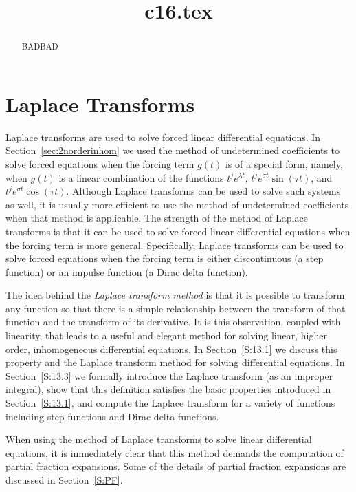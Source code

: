 \documentclass{ximera}
\title{c16.tex}
\begin{document}
\begin{abstract}
BADBAD
\end{abstract}
\maketitle

\chapter{Laplace Transforms}
\label{C:LT}

\normalsize

Laplace transforms are used to solve forced linear differential equations.  
In Section~\ref{sec:2norderinhom} we used the method of undetermined 
coefficients to solve forced equations when the forcing term $g(t)$ is of a 
special form, namely, when $g(t)$ is a linear combination of the functions 
$t^je^{\lambda t}$, $t^je^{\sigma t}\sin(\tau t)$, and 
$t^je^{\sigma t}\cos(\tau t)$.  Although Laplace transforms can be used to 
solve such systems as well, it is usually more efficient to use the method of 
undetermined coefficients when that method is applicable.  The strength of the 
method of Laplace transforms is that it can be used to solve forced linear 
differential equations when the forcing term is more general.  Specifically,
Laplace transforms can be used to solve forced equations when the forcing
term is either discontinuous (a step function) or an impulse function (a Dirac 
delta function).

The idea behind the {\em Laplace transform method} is that it is possible to 
transform any function so that there is a simple relationship between the 
transform of that function and the transform of its derivative.  It is this 
observation, coupled with linearity, that leads to a useful and elegant
method for solving linear, higher order, inhomogeneous differential equations.
In Section~\ref{S:13.1} we discuss this property and the Laplace
transform method for solving differential equations.  In Section~\ref{S:13.3}
we formally introduce the Laplace transform (as an improper integral), show
that this definition satisfies the basic properties introduced in
Section~\ref{S:13.1}, and compute the Laplace transform for a variety of
functions including step functions and Dirac delta functions.

When using the method of Laplace transforms to solve linear differential
equations, it is immediately clear that this method demands the computation of 
partial fraction expansions.  Some of the details of partial fraction
expansions are discussed in Section~\ref{S:PF}.  
\end{document}
